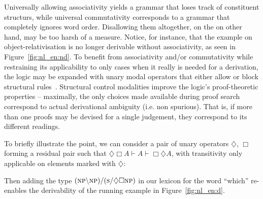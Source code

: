 Universally allowing associativity yields a grammar that loses track of constituent structurs, while universal commutativity corresponds to a grammar that completely ignores word order. 
Disallowing them altogether, on the on other hand, may be too harsh of a measure.
Notice, for instance, that the example on object-relativisation is no longer derivable without associativity, as seen in Figure~\ref{fig:nl_en:nd}.
To benefit from associativity and/or commutativity while restraining its applicability to only cases when it really is needed for a derivation, the logic may be expanded with unary modal operators that either allow or block structural rules~\cite{kurtonina1997structural}.
Structural control modalities improve the logic's proof-theoretic properties -- maximally, the only choices made available during proof search correspond to actual derivational ambiguity (i.e. non spurious).
That is, if more than one proofs may be devised for a single judgement, they correspond to its different readings.

To briefly illustrate the point, we can consider a pair of unary operators $\diamondsuit$, $\Box$ forming a residual pair such that $\diamondsuit \Box A \vdash A \vdash \Box \diamondsuit A$, with transitivity only applicable on elements marked with $\diamondsuit$:
\[
\] 

Then adding the type $(\textsc{np} \backslash \textsc{np}) / (\textsc{s}/\diamondsuit \Box \textsc{np})$ in our lexicon for the word ``which'' re-enables the derivability of the running example in Figure~\ref{fig:nl_en:d}.

